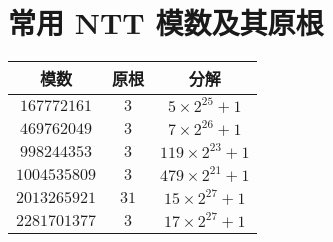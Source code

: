 \section{常用 NTT 模数及其原根}

\begin{center}
    \begin{tabular}{c|c|c}
        模数 & 原根 & 分解 \\
        \hline
        $167772161$ & $3$ & $5 \times 2^{25} + 1$ \\
        \hline
        $469762049$ & $3$ & $7 \times 2^{26} + 1$ \\
        \hline
        $998244353$ & $3$ & $119 \times 2^{23} + 1$ \\
        \hline
        $1004535809$ & $3$ & $479 \times 2^{21} + 1$ \\
        \hline
        $2013265921$ & $31$ & $15 \times 2^{27} + 1$ \\
        \hline
        $2281701377$ & $3$ & $17 \times 2^{27} + 1$ \\
    \end{tabular}
\end{center}